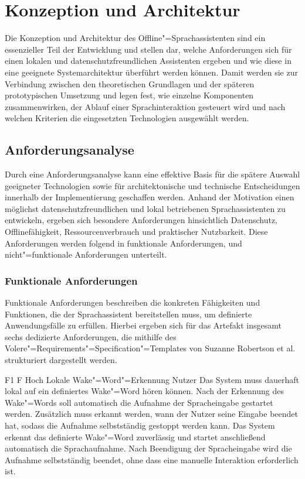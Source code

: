 \chapter{Konzeption und Architektur}
\label{chap:Konzeption_und_Architektur}
Die Konzeption und Architektur des Offline"=Sprachassistenten sind ein essenzieller Teil der Entwicklung und stellen dar, welche Anforderungen sich für einen lokalen und datenschutzfreundlichen Assistenten ergeben und wie diese in eine geeignete Systemarchitektur überführt werden können. Damit werden sie zur Verbindung zwischen den theoretischen Grundlagen und der späteren prototypischen Umsetzung und legen fest, wie einzelne Komponenten zusammenwirken, der Ablauf einer Sprachinteraktion gesteuert wird und nach welchen Kriterien die eingesetzten Technologien ausgewählt werden.


\section{Anforderungsanalyse}
\label{sec:Anforderungsanalyse}
Durch eine Anforderungsanalyse kann eine effektive Basis für die spätere Auswahl geeigneter Technologien sowie für architektonische und technische Entscheidungen innerhalb der Implementierung geschaffen werden. Anhand der Motivation einen möglichst datenschutzfreundlichen und lokal betriebenen Sprachassistenten zu entwickeln, ergeben sich besondere Anforderungen hinsichtlich Datenschutz, Offlinefähigkeit, Ressourcenverbrauch und praktischer Nutzbarkeit. Diese Anforderungen werden folgend in funktionale Anforderungen, und nicht"=funktionale Anforderungen unterteilt.


\subsection{Funktionale Anforderungen}
\label{subsec:Funktionale_Anforderungen}
Funktionale Anforderungen beschreiben die konkreten Fähigkeiten und Funktionen, die der Sprachassistent bereitstellen muss, um definierte Anwendungsfälle zu erfüllen. Hierbei ergeben sich für das Artefakt insgesamt sechs dedizierte Anforderungen, die mithilfe des Volere"=Requirements"=Specification"=Templates \autocite{masteringRequirementsProcess} von Suzanne Robertson et al. strukturiert dargestellt werden.

\clearpage
\snowcard
{F1}
{F}
{Hoch}
{Lokale Wake"=Word"=Erkennung}
{Nutzer}
{}
{Das System muss dauerhaft lokal auf ein definiertes Wake"=Word hören können. Nach der Erkennung des Wake"=Words soll automatisch die Aufnahme der Spracheingabe gestartet werden. Zusätzlich muss erkannt werden, wann der Nutzer seine Eingabe beendet hat, sodass die Aufnahme selbstständig gestoppt werden kann.}
{Das System erkennt das definierte Wake"=Word zuverlässig und startet anschließend automatisch die Sprachaufnahme. Nach Beendigung der Spracheingabe wird die Aufnahme selbstständig beendet, ohne dass eine manuelle Interaktion erforderlich ist.}
{}

